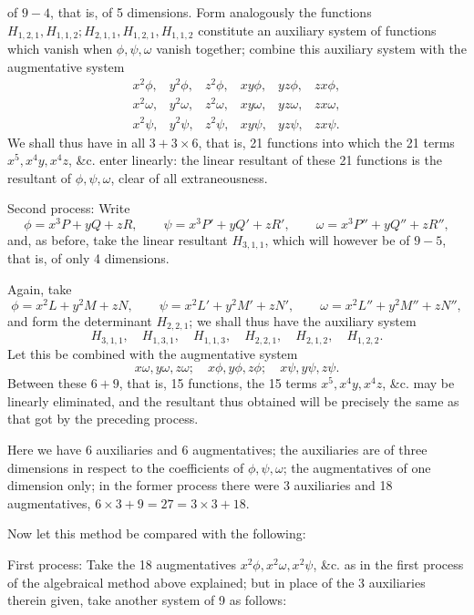 \documentclass[11pt]{article}
\newcommand{\sourcepage}[1]{\marginpar{\scriptsize p.~#1}}
\begin{document}
{{\sourcepage{299}
of $9-4$, that is, of 5 dimensions. Form analogously the functions $H_{1,2,1},H_{1,1,2}; H_{2,1,1},H_{1,2,1},H_{1,1,2}$ constitute an auxiliary system of functions which vanish when $\phi,\psi,\omega$ vanish together; combine this auxiliary system with the augmentative system
\[
\begin{array}{cccccc}
x^2\phi,&y^2\phi,&z^2\phi,&xy\phi,&yz\phi,&zx\phi,\\
x^2\omega,&y^2\omega,&z^2\omega,&xy\omega,&yz\omega,&zx\omega,\\
x^2\psi,&y^2\psi,&z^2\psi,&xy\psi,&yz\psi,&zx\psi.
\end{array}
\]
We shall thus have in all $3+3\times6$, that is, 21 functions into which the 21 terms $x^5,x^4y,x^4z$, \&c. enter linearly: the linear resultant of these 21 functions is the resultant of $\phi,\psi,\omega$, clear of all extraneousness.

Second process: Write
\[
\phi=x^3P+yQ+zR,
\qquad
\psi=x^3P'+yQ'+zR',
\qquad
\omega=x^3P''+yQ''+zR'',
\]
and, as before, take the linear resultant $H_{3,1,1}$, which will however be of $9-5$, that is, of only 4 dimensions.

Again, take
\[
\phi=x^2L+y^2M+zN,
\qquad
\psi=x^2L'+y^2M'+zN',
\qquad
\omega=x^2L''+y^2M''+zN'',
\]
and form the determinant $H_{2,2,1}$; we shall thus have the auxiliary system
\[
H_{3,1,1},\quad H_{1,3,1},\quad H_{1,1,3},\quad H_{2,2,1},\quad H_{2,1,2},\quad H_{1,2,2}.
\]
Let this be combined with the augmentative system
\[
x\omega,	y\omega,	z\omega;\quad x\phi,	y\phi,	z\phi;\quad x\psi,	y\psi,	z\psi.
\]
Between these $6+9$, that is, 15 functions, the 15 terms $x^5,x^4y,x^4z$, \&c. may be linearly eliminated, and the resultant thus obtained will be precisely the same as that got by the preceding process.

Here we have 6 auxiliaries and 6 augmentatives; the auxiliaries are of three dimensions in respect to the coefficients of $\phi,\psi,\omega$; the augmentatives of one dimension only; in the former process there were 3 auxiliaries and 18 augmentatives, $6\times3+9=27=3\times3+18$.

Now let this method be compared with the following:

First process: Take the 18 augmentatives $x^2\phi,x^2\omega,x^2\psi$, \&c. as in the first process of the algebraical method above explained; but in place of the 3 auxiliaries therein given, take another system of 9 as follows:

}}
\end{document}
